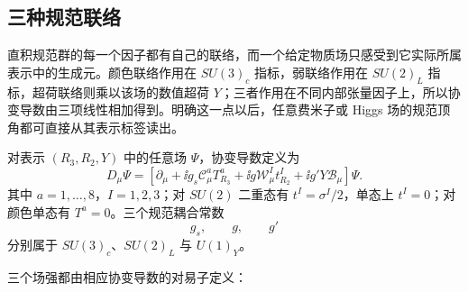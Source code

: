 \subsection{三种规范联络}

直积规范群的每一个因子都有自己的联络，而一个给定物质场只感受到它实际所属表示中的生成元。颜色联络作用在 $SU(3)_c$ 指标，弱联络作用在 $SU(2)_L$ 指标，超荷联络则乘以该场的数值超荷 $Y$；三者作用在不同内部张量因子上，所以协变导数由三项线性相加得到。明确这一点以后，任意费米子或 Higgs 场的规范顶角都可直接从其表示标签读出。

对表示 $(R_3,R_2,Y)$ 中的任意场 $\Psi$，协变导数定义为
\begin{equation}
 {
 D_\mu\Psi
 =\left[
 \partial_\mu
 +\ii g_s\mathscr C_\mu^aT_{R_3}^a
 +\ii g\mathcal W_\mu^I t_{R_2}^I
 +\ii g'Y\mathcal B_\mu
 \right]\Psi.}
 \label{eq:sm-covariant-derivative-dp11}
\end{equation}
其中 $a=1,\ldots,8$，$I=1,2,3$；对 $SU(2)$ 二重态有 $t^I=\sigma^I/2$，单态上 $t^I=0$；对颜色单态有 $T^a=0$。三个规范耦合常数
\begin{equation*}
 g_s,\qquad g,\qquad g'
\end{equation*}
分别属于 $SU(3)_c$、$SU(2)_L$ 与 $U(1)_Y$。


三个场强都由相应协变导数的对易子定义：


